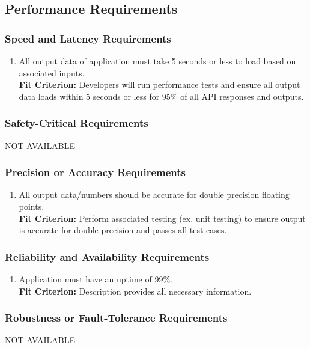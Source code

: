 \documentclass[12pt,letterpaper]{article}
\begin{document}
\subsection{Performance Requirements}
\subsubsection{Speed and Latency Requirements}
\begin{enumerate}[{PE}1.] 
	\item All output data of application must take 5 seconds or less to load based on associated inputs.\\
	{\textbf{Fit Criterion:} Developers will run performance tests and ensure all output data loads within 5 seconds or less for 95\% of all API responses and outputs.}
\end{enumerate}

\subsubsection{Safety-Critical Requirements}
\noindent NOT AVAILABLE

\subsubsection{Precision or Accuracy Requirements}
\begin{enumerate}[resume*] 
	\item All output data/numbers should be accurate for double precision floating points.\\
	{\textbf{Fit Criterion:} Perform associated testing (ex. unit testing) to ensure output is accurate for double precision and passes all test cases. }
\end{enumerate}

\subsubsection{Reliability and Availability Requirements}
\begin{enumerate}[resume*] 
	\item Application must have an uptime of 99\%.\\
	{\textbf{Fit Criterion:} Description provides all necessary information. }
\end{enumerate}

\subsubsection{Robustness or Fault-Tolerance Requirements}
\noindent NOT AVAILABLE
\end{document}
